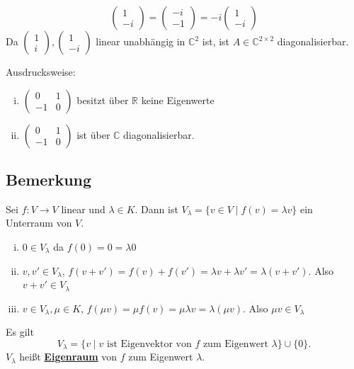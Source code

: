 \begin{enumerate}[(i)]
\[\begin{pmatrix}
		1 \\ -i
	\end{pmatrix} = \begin{pmatrix}
		-i \\ -1
	\end{pmatrix} = - i \begin{pmatrix}
		1  \\ -i
	\end{pmatrix}
	\]
	Da $ \begin{pmatrix}
		1 \\ i
	\end{pmatrix} , \begin{pmatrix}
		1 \\ -i
	\end{pmatrix}$ linear unabhängig in $\mathds{C}^2$ ist, ist $A \in \mathds{C}^{2 \times 2}$ diagonalisierbar.
\end{enumerate}
Ausdrucksweise: 
\begin{enumerate}[(i)]
	\item $\begin{pmatrix}
		0 & 1 \\
		-1 & 0
	\end{pmatrix}$ besitzt über $\mathds{R}$ keine Eigenwerte
	\item $\begin{pmatrix}
		0 & 1 \\
		-1 & 0
	\end{pmatrix}$ ist über $\mathds{C}$ diagonalisierbar.
\end{enumerate} 

\subsection{Bemerkung} %
\label{sub:bemerkung}
Sei $f : V \to V$ linear und $\lambda \in K$. Dann ist $V_\lambda = \{ v \in V \mid f(v)= \lambda v \}$ ein Unterraum von $V$.
\begin{enumerate}[(i)]
	\item $0 \in V_\lambda $ da $f(0)= 0 = \lambda 0$
	\item $v, v' \in V_\lambda $, $f(v+v')= f(v)+ f(v')= \lambda v + \lambda v' = \lambda (v+v')$. Also $v+v' \in V_\lambda $
	\item $v \in V_\lambda , \mu \in K$,  $f(\mu v) = \mu f(v) = \mu \lambda v = \lambda ( \mu v) $. Also $\mu v \in V_\lambda $
\end{enumerate}
Es gilt 
\[
	V_\lambda = \{ v \mid v \text{ ist Eigenvektor von $f$ zum Eigenwert }\lambda  \} \cup \{ 0\}.
\]
$V_\lambda $ heißt \underline{\textbf{Eigenraum}} von $f$ zum Eigenwert $\lambda$.

